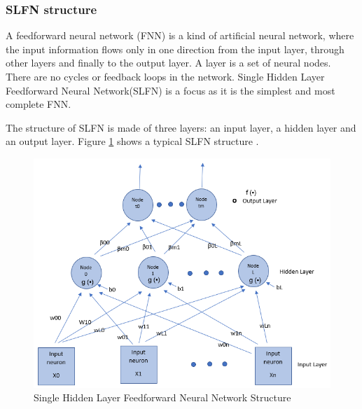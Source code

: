 \documentclass[a4paper, 14pt]{extarticle}
\begin{document}
\subsubsection{SLFN structure}
\par A feedforward neural network (FNN) is a kind of artificial neural network, where the input information flows only in one direction from the input layer, through other layers and finally to the output layer. A layer is a set of neural nodes. There are no cycles or feedback loops in the network\cite{Goodfellow-et-al-2016}\cite{witten2016data}. Single Hidden Layer Feedforward Neural Network(SLFN) is a focus as it is the simplest and most complete FNN. 
\par The structure of SLFN is made of three layers: an input layer, a hidden layer and an output layer. Figure \ref{fig:SLFN} shows a typical SLFN structure \cite{witten2016data}. 
\begin{figure}[H]
\centering
\includegraphics[width=\textwidth]{SLFN.png}
\caption{\label{fig:SLFN}Single Hidden Layer Feedforward Neural Network Structure}
\end{figure}
\end{document}
